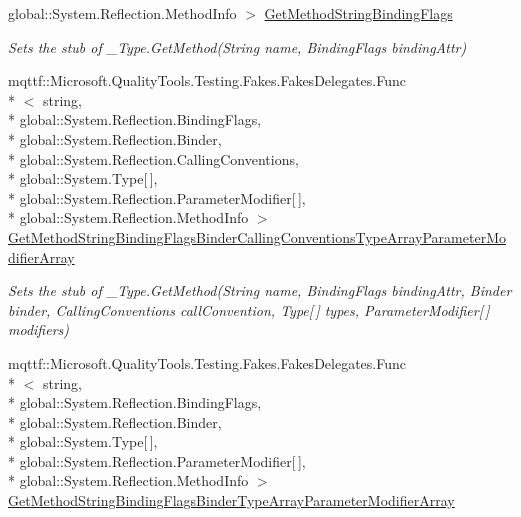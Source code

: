 \begin{DoxyCompactItemize}
global\-::\-System.\-Reflection.\-Method\-Info $>$ \hyperlink{class_system_1_1_runtime_1_1_interop_services_1_1_fakes_1_1_stub___type_acb6ae5a473b56a04ace3c2d5afa8d0ed}{Get\-Method\-String\-Binding\-Flags}
\begin{DoxyCompactList}\small\item\em Sets the stub of \-\_\-\-Type.\-Get\-Method(\-String name, Binding\-Flags binding\-Attr)\end{DoxyCompactList}\item 
mqttf\-::\-Microsoft.\-Quality\-Tools.\-Testing.\-Fakes.\-Fakes\-Delegates.\-Func\\*
$<$ string, \\*
global\-::\-System.\-Reflection.\-Binding\-Flags, \\*
global\-::\-System.\-Reflection.\-Binder, \\*
global\-::\-System.\-Reflection.\-Calling\-Conventions, \\*
global\-::\-System.\-Type\mbox{[}$\,$\mbox{]}, \\*
global\-::\-System.\-Reflection.\-Parameter\-Modifier\mbox{[}$\,$\mbox{]}, \\*
global\-::\-System.\-Reflection.\-Method\-Info $>$ \hyperlink{class_system_1_1_runtime_1_1_interop_services_1_1_fakes_1_1_stub___type_abd29f0b5aa26cf95b71bc5a858de68a9}{Get\-Method\-String\-Binding\-Flags\-Binder\-Calling\-Conventions\-Type\-Array\-Parameter\-Modifier\-Array}
\begin{DoxyCompactList}\small\item\em Sets the stub of \-\_\-\-Type.\-Get\-Method(\-String name, Binding\-Flags binding\-Attr, Binder binder, Calling\-Conventions call\-Convention, Type\mbox{[}$\,$\mbox{]} types, Parameter\-Modifier\mbox{[}$\,$\mbox{]} modifiers)\end{DoxyCompactList}\item 
mqttf\-::\-Microsoft.\-Quality\-Tools.\-Testing.\-Fakes.\-Fakes\-Delegates.\-Func\\*
$<$ string, \\*
global\-::\-System.\-Reflection.\-Binding\-Flags, \\*
global\-::\-System.\-Reflection.\-Binder, \\*
global\-::\-System.\-Type\mbox{[}$\,$\mbox{]}, \\*
global\-::\-System.\-Reflection.\-Parameter\-Modifier\mbox{[}$\,$\mbox{]}, \\*
global\-::\-System.\-Reflection.\-Method\-Info $>$ \hyperlink{class_system_1_1_runtime_1_1_interop_services_1_1_fakes_1_1_stub___type_ad39a9b201a57334fbc2093177cff2126}{Get\-Method\-String\-Binding\-Flags\-Binder\-Type\-Array\-Parameter\-Modifier\-Array}

\end{DoxyCompactItemize}
